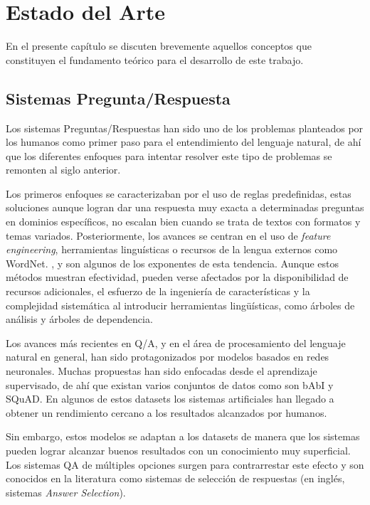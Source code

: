\chapter{Estado del Arte}\label{chapter:background}

En el presente capítulo se discuten brevemente aquellos conceptos que constituyen el fundamento teórico para el desarrollo de este trabajo.

\section{Sistemas Pregunta/Respuesta}

Los sistemas Preguntas/Respuestas han sido uno de los problemas planteados por los humanos como primer paso para el entendimiento del lenguaje natural, de ahí que los diferentes enfoques para intentar resolver este tipo de problemas se remonten al siglo anterior.

Los primeros enfoques se caracterizaban por el uso de reglas predefinidas, estas soluciones aunque logran dar una respuesta muy exacta a determinadas preguntas en dominios específicos, no escalan bien cuando se trata de textos con formatos y temas variados. Posteriormente, los avances se centran en el uso de \textit{feature engineering}, herramientas linguísticas o recursos de la lengua externos como WordNet. \cite{2013-yih-lexical-semantic-model}, \cite{2013-yao-edit-distance} y \cite{2010-textual-entailment} son algunos de los exponentes de esta tendencia. Aunque estos métodos muestran efectividad, pueden verse afectados por la disponibilidad de recursos adicionales, el esfuerzo de la ingeniería de características y la complejidad sistemática al introducir herramientas lingüísticas, como árboles de análisis y árboles de dependencia. 

Los avances más recientes en Q/A, y en el área de procesamiento del lenguaje natural en general, han sido protagonizados por modelos basados en redes neuronales. Muchas propuestas han sido enfocadas desde el aprendizaje supervisado, de ahí que existan varios conjuntos de datos como son bAbI y SQuAD. En algunos de estos datasets los sistemas artificiales han llegado a obtener un rendimiento cercano a los resultados alcanzados por humanos. 

Sin embargo, estos modelos se adaptan a los datasets de manera que los sistemas pueden lograr alcanzar buenos resultados con un conocimiento muy superficial. Los sistemas QA de múltiples opciones surgen para contrarrestar este efecto y son conocidos en la literatura como sistemas de selección de respuestas (en inglés, sistemas \textit{Answer Selection}). 

